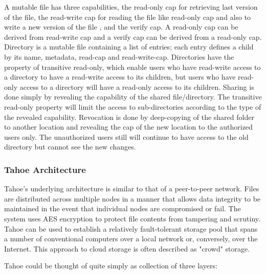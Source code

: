 \documentclass[11pt]{article}
\begin{document}
A mutable file has three capabilities, the read-only cap for retrieving 
last version of the file, the read-write cap for reading the file like 
read-only cap and also to write a new version of the file , and the 
verify cap. A read-only cap can be derived from read-write cap and a 
verify cap can be derived from a read-only cap. Directory is a mutable 
file containing a list of entries; each entry defines a child by its name, 
metadata, read-cap and read-write-cap. Directories have the property of 
transitive read-only, which enable users who have read-write access to a 
directory to have a read-write access to its children, but users who have 
read-only access to a directory will have a read-only access to its 
children. Sharing is done simply by revealing the capability of the shared 
file/directory. The transitive read-only property will limit the access to 
sub-directories according to the type of the revealed capability. 
Revocation is done by deep-copying  of the shared folder to another 
location and revealing the cap of the new location to the authorized users 
only. The unauthorized users still will continue to have access to the 
old directory but cannot see the new changes.

\subsubsection{Tahoe Architecture}
Tahoe's underlying architecture is similar to that of a peer-to-peer 
network. Files are distributed across multiple nodes in a manner that 
allows data integrity to be maintained in the event that individual nodes 
are compromised or fail. The system uses AES encryption to protect file 
contents from tampering and scrutiny. Tahoe can be used to establish a 
relatively fault-tolerant storage pool that spans a number of conventional 
computers over a local network or, conversely, over the Internet. This 
approach to cloud storage is often described as "crowd" storage.

Tahoe could be thought of quite simply as collection of three layers: 
\end{document}
